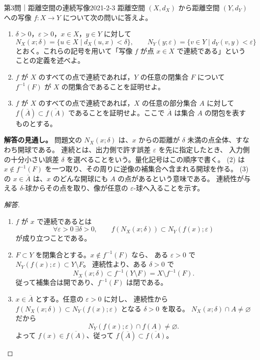 \begin{problem}{第3問｜距離空間の連続写像}{2021-2-3}
距離空間 $(X,d_X)$ から距離空間 $(Y,d_Y)$ への写像 $f:X\to Y$ について次の問いに答えよ。
\begin{enumerate}
  \item[(1)] $\delta>0$，$\varepsilon>0$，$x\in X$，$y\in Y$ に対して
  \[
  N_X(x;\delta)=\{u\in X\mid d_X(u,x)<\delta\},\qquad
  N_Y(y;\varepsilon)=\{v\in Y\mid d_Y(v,y)<\varepsilon\}
  \]
  とおく。これらの記号を用いて「写像 $f$ が点 $x\in X$ で連続である」ということの定義を述べよ。
  \item[(2)] $f$ が $X$ のすべての点で連続であれば，$Y$ の任意の閉集合 $F$ について $f^{-1}(F)$ が $X$ の閉集合であることを証明せよ。
  \item[(3)] $f$ が $X$ のすべての点で連続であれば，$X$ の任意の部分集合 $A$ に対して $f(\overline A)\subset\overline{f(A)}$ であることを証明せよ。ここで $\overline A$ は集合 $A$ の閉包を表すものとする。
\end{enumerate}
\end{problem}
\begin{memo*}
\textbf{解答の見通し。}
問題文の $N_X(x;\delta)$ は、$x$ からの距離が $\delta$ 未満の点全体、すなわち開球である。
連続とは、出力側で許す誤差 $\varepsilon$ を先に指定したとき、
入力側の十分小さい誤差 $\delta$ を選べることをいう。量化記号はこの順序で書く。
(2) は $x\notin f^{-1}(F)$ を一つ取り、その周りに逆像の補集合へ含まれる開球を作る。
(3) の $x\in\overline A$ は、$x$ のどんな開球にも $A$ の点があるという意味である。
連続性が与える $\delta$-球からその点を取り、像が任意の $\varepsilon$-球へ入ることを示す。
\end{memo*}
\begin{proof}[解答]
\begin{enumerate}
  \item[(1)] $f$ が $x$ で連続であるとは
  \[
  \forall\varepsilon>0\ \exists\delta>0,\qquad
  f(N_X(x;\delta))\subset N_Y(f(x);\varepsilon)
  \]
  が成り立つことである。

  \item[(2)] $F\subset Y$ を閉集合とする。$x\notin f^{-1}(F)$ なら、
  ある $\varepsilon>0$ で
  $N_Y(f(x);\varepsilon)\subset Y\setminus F$。
  連続性より、ある $\delta>0$ で
  \[
  N_X(x;\delta)\subset f^{-1}(Y\setminus F)
  =X\setminus f^{-1}(F).
  \]
  従って補集合は開であり、$f^{-1}(F)$ は閉である。

  \item[(3)] $x\in\overline A$ とする。任意の $\varepsilon>0$ に対し、
  連続性から
  $f(N_X(x;\delta))\subset N_Y(f(x);\varepsilon)$ となる $\delta>0$ を取る。
  $N_X(x;\delta)\cap A\ne\varnothing$ だから
  \[
  N_Y(f(x);\varepsilon)\cap f(A)\ne\varnothing.
  \]
  よって $f(x)\in\overline{f(A)}$、従って
  $f(\overline A)\subset\overline{f(A)}$。
\end{enumerate}
\end{proof}
